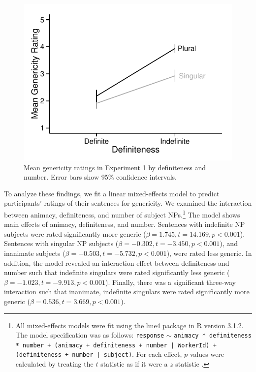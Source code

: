\documentclass[10pt,letterpaper]{article}
\begin{document}
\begin{figure}[t]
\centering
\includegraphics[width=.9\linewidth]{figures/e1.pdf}
\caption{\label{fig:e1} Mean genericity ratings in Experiment 1 by definiteness and number. Error bars show 95\% confidence intervals.} 
\end{figure}

To analyze these findings, we fit a linear mixed-effects model to predict participants' ratings of their sentences for genericity. We examined the interaction between animacy, definiteness, and number of subject NPs.\footnote{All mixed-effects models were fit using the lme4 package in R version 3.1.2. The model specification was as follows: \texttt{response} \(\sim\) \texttt{animacy * definiteness * number + (animacy + definiteness + number | WorkerId) + (definiteness + number | subject)}. For each effect, \(p\) values were calculated by treating the \(t\) statistic as if it were a \(z\) statistic \cite{Barr:2013}.} The model shows main effects of animacy, definiteness, and number. Sentences with indefinite NP subjects were rated significantly more generic (\(\beta = 1.745, t = 14.169, p < 0.001\)). Sentences with singular NP subjects (\(\beta = -0.302, t = -3.450, p < 0.001\)), and inanimate subjects (\(\beta = -0.503, t = -5.732, p < 0.001\)), were rated less generic. In addition, the model revealed an interaction effect between definiteness and number such that indefinite singulars were rated significantly less generic (\(\beta = -1.023, t = -9.913, p < 0.001\)). Finally, there was a significant three-way interaction such that inanimate, indefinite singulars were rated significantly more generic (\(\beta = 0.536, t = 3.669, p < 0.001\)). 
\end{document}
